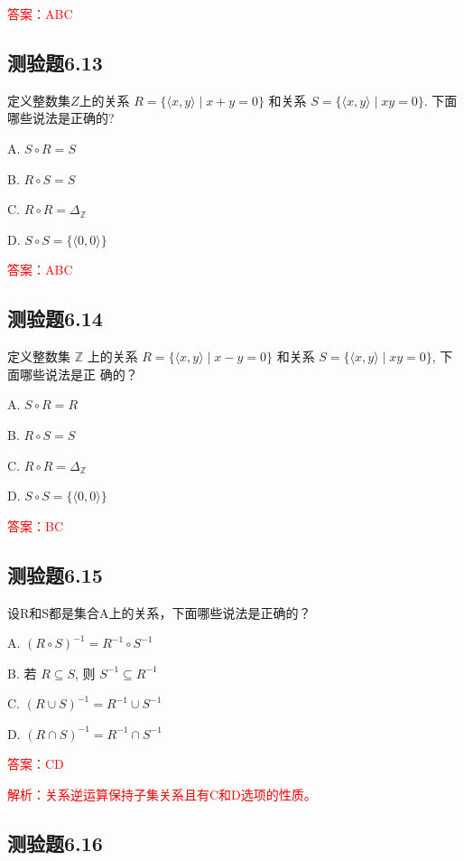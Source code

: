 \documentclass[UTF8, heading=true]{ctexart}
\begin{document}
\textcolor{red}{答案：ABC}




\subsection{测验题6.13}
定义整数集$Z$上的关系 $R=\{\langle x, y\rangle \mid x+y=0\}$ 和关系 $S=\{\langle x, y\rangle \mid x y=0\}$. 下面哪些说法是正确的?

A. 
$
S \circ R=S
$

B. 
$
R \circ S=S
$

C. 
$
R \circ R=\Delta_{\mathbb{Z}}
$

D. 
$
S \circ S=\{\langle 0,0\rangle\}
$

\textcolor{red}{答案：ABC}

\subsection{测验题6.14}

定义整数集 $\mathbb{Z}$ 上的关系 $R=\{\langle x, y\rangle \mid x-y=0\}$ 和关系 $S=\{\langle x, y\rangle \mid x y=0\}$, 下面哪些说法是正
确的？

A. $S \circ R=R$

B. $R \circ S=S$

C. $R \circ R=\Delta_{\mathbb{Z}}$

D. $S \circ S=\{\langle 0,0\rangle\}$

\textcolor{red}{答案：BC}

\subsection{测验题6.15}

设R和S都是集合A上的关系，下面哪些说法是正确的？

A. $(R \circ S)^{-1}=R^{-1} \circ S^{-1}$

B. 若 $R \subseteq S$, 则 $S^{-1} \subseteq R^{-1}$

C. $(R \cup S)^{-1}=R^{-1} \cup S^{-1}$

D. $(R \cap S)^{-1}=R^{-1} \cap S^{-1}$

\textcolor{red}{答案：CD}

\textcolor{red}{解析：关系逆运算保持子集关系且有C和D选项的性质。}

\subsection{测验题6.16}
\end{document}
